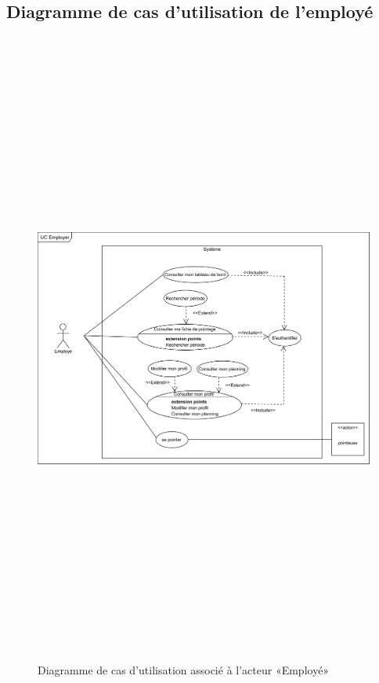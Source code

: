 \clearpage  
    \subsection{Diagramme de cas d'utilisation de l'employé}
        \begin{figure}[h!]
            \centering
            \includegraphics[angle=90, height=21cm]{images/uc_employe.png}
            \caption{Diagramme de cas d'utilisation associé à l'acteur «Employé»}
            \label{fig2}
        \end{figure}
        
